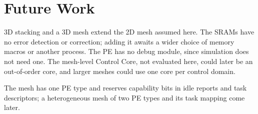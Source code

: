 
\section{Future Work}\label{sec:future}

%
3D stacking and a 3D mesh extend the 2D mesh assumed here.
The SRAMs have no error detection or correction; adding it awaits a wider choice of memory macros or another process.
The PE has no debug module, since simulation does not need one.
The mesh-level Control Core, not evaluated here, could later be an out-of-order core, and larger meshes could use one core per control domain.

%
The mesh has one PE type and reserves capability bits in idle reports and task descriptors; a heterogeneous mesh of two PE types and its task mapping come later.
